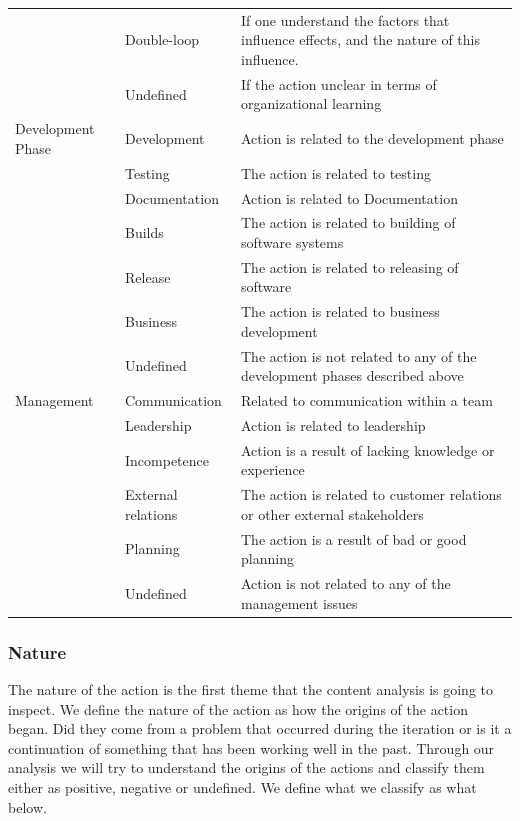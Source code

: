 \begin{table}[!h]
\begin{center}
\begin{adjustbox}{width=\textwidth, totalheight=0.95\textheight, keepaspectratio}
\begin{tabular}{| l | l | p{} |}
			& Double-loop & If one understand the factors that influence effects, and the nature of this influence. \\ \cline{2-3}
			& Undefined & If the action unclear in terms of organizational learning \\ \hline
			Development Phase & Development & Action is related to the development phase \\ \cline{2-3}
			& Testing & The action is related to testing \\ \cline{2-3}
			& Documentation & Action is related to Documentation \\ \cline{2-3}
			& Builds & The action is related to building of software systems \\ \cline{2-3}
			& Release & The action is related to releasing of software \\ \cline{2-3}
			& Business & The action is related to business development \\ \cline{2-3}
			& Undefined & The action is not related to any of the development phases described above \\ 
			\hline
			Management & Communication & Related to communication within a team \\ \cline{2-3}
			& Leadership & Action is related to leadership \\ \cline{2-3}
			& Incompetence & Action is a result of lacking knowledge or experience \\ \cline{2-3}
			& External relations & The action is related to customer relations or other external stakeholders \\ \cline{2-3}
			& Planning & The action is a result of bad or good planning \\ \cline{2-3}
			& Undefined & Action is not related to any of the management issues \\
			\hline
			\end{tabular}
		\end{adjustbox}
	\end{center}
\end{table}

\subsubsection{Nature}
The nature of the action is the first theme that the content analysis is going to inspect. We define the nature of the action as how the origins of the action began. Did they come from a problem that occurred during the iteration or is it a continuation of something that has been working well in the past. Through our analysis we will try to understand the origins of the actions and classify them either as positive, negative or undefined. We define what we classify as what below. 
